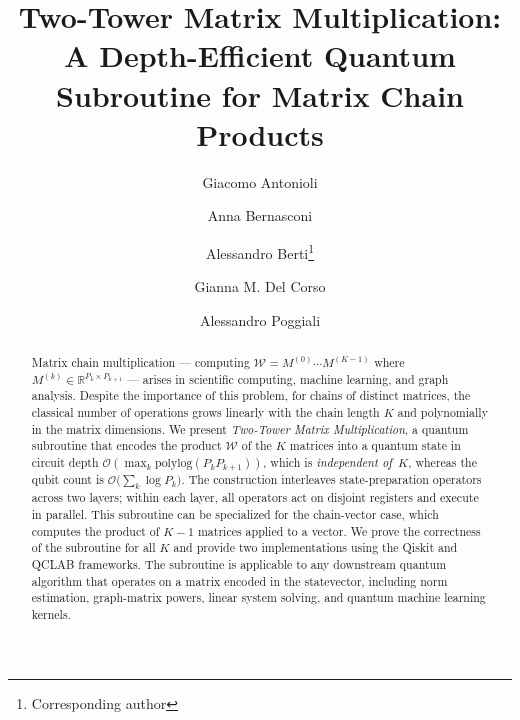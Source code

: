 \documentclass[a4paper,UKenglish,cleveref,autoref,thm-restate]{socg-lipics-v2021}
\title{Two-Tower Matrix Multiplication: A Depth-Efficient Quantum Subroutine for Matrix Chain Products}
\author{Giacomo Antonioli}{Department of Computer Science, University of Pisa, Italy}{giacomo.antonioli@phd.unipi.it}{https://orcid.org/0009-0000-6687-0357}{}
\author{Anna Bernasconi}{Department of Computer Science, University of Pisa, Italy}{anna.bernasconi@unipi.it}{https://orcid.org/0000-0003-0263-5221}{}
\author{Alessandro Berti\footnote{Corresponding author}}{Department of Computer Science and Department of Physics, University of Pisa, Italy}{alessandro.berti@df.unipi.it}{https://orcid.org/0000-0001-9144-9572}{}
\author{Gianna M. Del Corso}{Department of Computer Science, University of Pisa, Italy}{gianna.delcorso@unipi.it}{https://orcid.org/0000-0002-5651-9368}{}
\author{Alessandro Poggiali}{Department of Computer Science, University of Pisa, Italy}{alessandro.poggiali@phd.unipi.it}{https://orcid.org/0000-0002-1591-7925}{}
\begin{document}
\maketitle

\begin{abstract}
Matrix chain multiplication --- computing
$\mathcal{W} = M^{(0)}\cdots M^{(K-1)}$ where
$M^{(k)} \in \mathbb{R}^{P_k \times P_{k+1}}$  ---
arises in scientific computing, machine learning, and graph analysis. Despite the importance of this problem, for chains of distinct matrices, the classical number of operations grows linearly with the chain length $K$ and polynomially in the matrix dimensions.
We present \emph{Two-Tower Matrix Multiplication}, a quantum subroutine that encodes the product $\mathcal{W}$ of the $K$ matrices  into a quantum state in circuit depth
$\mathcal{O}(\max_{k}  \mathrm{polylog} (P_k P_{k+1}))$, which is \emph{independent
of~$K$}, whereas the qubit count is $\mathcal{O}\bigl(\sum_{k} \log P_k \bigr)$.
The construction interleaves state-preparation operators across two layers; within each layer, all operators act on disjoint registers and execute in parallel. This subroutine can be specialized for the chain-vector case, which computes the product
of $K-1$ matrices applied to a vector.
We prove the correctness of the subroutine for all $K$ and provide two implementations using the Qiskit and QCLAB frameworks. The subroutine is applicable to any downstream quantum algorithm that operates on a matrix encoded in the statevector, including norm estimation, graph-matrix powers, linear system solving, and quantum machine learning kernels.
\end{abstract}

\end{document}
